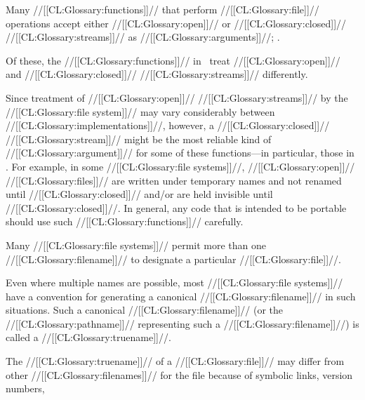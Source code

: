 
Many //[[CL:Glossary:functions]]// that perform //[[CL:Glossary:file]]// operations accept either
//[[CL:Glossary:open]]// or //[[CL:Glossary:closed]]// //[[CL:Glossary:streams]]// as //[[CL:Glossary:arguments]]//;
\seesection\StreamArgsToStandardizedFns.

Of these, the //[[CL:Glossary:functions]]// in \thenextfigure\ treat //[[CL:Glossary:open]]// and 
//[[CL:Glossary:closed]]// //[[CL:Glossary:streams]]// differently.


Since treatment of //[[CL:Glossary:open]]// //[[CL:Glossary:streams]]// by the //[[CL:Glossary:file system]]// 
may vary considerably between //[[CL:Glossary:implementations]]//, however, 
a //[[CL:Glossary:closed]]// //[[CL:Glossary:stream]]// might be the most reliable kind of
//[[CL:Glossary:argument]]// for some of these functions---in particular, those in
\thenextfigure.  For example, in some //[[CL:Glossary:file systems]]//, 
//[[CL:Glossary:open]]// //[[CL:Glossary:files]]// are written under temporary names 
and not renamed until //[[CL:Glossary:closed]]//
and/or are held invisible until //[[CL:Glossary:closed]]//.
In general, any code that is intended to be portable should
use such //[[CL:Glossary:functions]]// carefully.



\endsubsection%


Many //[[CL:Glossary:file systems]]// permit more than one //[[CL:Glossary:filename]]// to designate 
a particular //[[CL:Glossary:file]]//.

Even where multiple names are possible, most //[[CL:Glossary:file systems]]// have a convention
for generating a canonical //[[CL:Glossary:filename]]// in such situations.  Such a canonical
//[[CL:Glossary:filename]]// (or the //[[CL:Glossary:pathname]]// representing such a //[[CL:Glossary:filename]]//) is
called a //[[CL:Glossary:truename]]//.  


The //[[CL:Glossary:truename]]// of a //[[CL:Glossary:file]]// may differ from other //[[CL:Glossary:filenames]]//
for the file because of
     symbolic links,
     version numbers,

